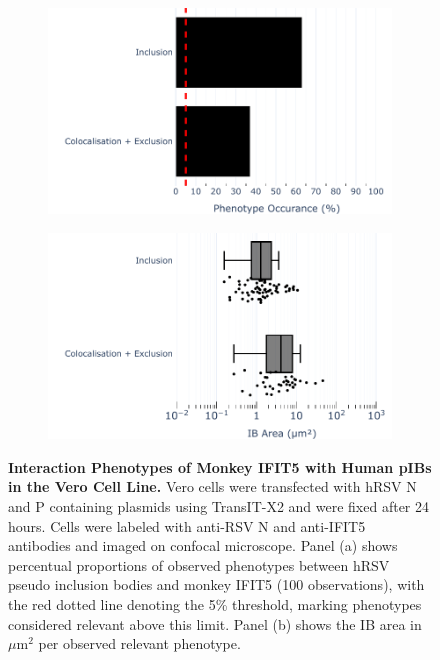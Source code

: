 \begin{figure}
    \begin{subfigure}{0.495\textwidth}
        \caption{}
        \includegraphics[width=1\linewidth]{09. Chapter 4/Figs/01. pIB/05. IFIT5/01. bar_i5_vero.pdf} 
    \end{subfigure}
    \begin{subfigure}{0.495\textwidth}
        \caption{}
        \includegraphics[width=1\linewidth]{09. Chapter 4/Figs/01. pIB/05. IFIT5/02. box_i5_vero.pdf}
    \end{subfigure}
    \caption[Interaction Phenotypes of Monkey IFIT5 with Human pIBs in the Vero Cell Line.]{\textbf{Interaction Phenotypes of Monkey IFIT5 with Human pIBs in the Vero Cell Line.} Vero cells were transfected with hRSV N and P containing plasmids using TransIT-X2 and were fixed after 24 hours. Cells were labeled with anti-RSV N and anti-IFIT5 antibodies and imaged on confocal microscope. Panel (a) shows percentual proportions of observed phenotypes between hRSV pseudo inclusion bodies and monkey IFIT5 (100 observations), with the red dotted line denoting the 5\% threshold, marking phenotypes considered relevant above this limit. Panel (b) shows the IB area in \(\mu \mbox{m}^2\) per observed relevant phenotype.}
    \label{fig:Interaction Phenotypes of Monkey IFIT5 with Human pIBs in the VERO Cell Line}
\end{figure}

